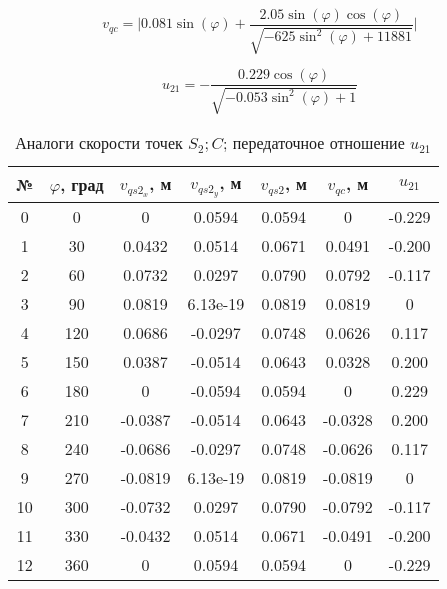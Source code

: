 \begin{equation}
	v_{qc} = \Big | 0.081 \sin{\left (\varphi \right )} + \frac{2.05 \sin{\left (\varphi \right )} \cos{\left (\varphi \right )}}{\sqrt{- 625 \sin^{2}{\left (\varphi \right )} + 11881}} \Big |
\end{equation}

\begin{equation}
	u_{21} = - \frac{0.229 \cos{\left (\varphi \right )}}{\sqrt{- 0.053 \sin^{2}{\left (\varphi \right )} + 1}}
\end{equation}

\begin{table}
\caption{Аналоги скорости точек $S_2; C$; передаточное отношение $u_{21}$}
\begin{tabular}{|c|c|c|c|c|c|c|}
	\hline 
	№& $\varphi$, град & $v_{qs2_x}$, м & $v_{qs2_y}$, м & $v_{qs2}$, м & $v_{qc}$, м & $u_{21}$ \\ 
	\hline 
	0  &    0 &        0 &    0.0594 &  0.0594 &        0 &  -0.229 \\
	\hline 
	1  &   30 &   0.0432 &    0.0514 &  0.0671 &   0.0491 &  -0.200 \\
	\hline 
	2  &   60 &   0.0732 &    0.0297 &  0.0790 &   0.0792 &  -0.117 \\
	\hline 
	3  &   90 &   0.0819 &  6.13e-19 &  0.0819 &   0.0819 &       0 \\
	\hline 
	4  &  120 &   0.0686 &   -0.0297 &  0.0748 &   0.0626 &   0.117 \\
	\hline 
	5  &  150 &   0.0387 &   -0.0514 &  0.0643 &   0.0328 &   0.200 \\
	\hline 
	6  &  180 &        0 &   -0.0594 &  0.0594 &        0 &   0.229 \\
	\hline 
	7  &  210 &  -0.0387 &   -0.0514 &  0.0643 &  -0.0328 &   0.200 \\
	\hline 
	8  &  240 &  -0.0686 &   -0.0297 &  0.0748 &  -0.0626 &   0.117 \\
	\hline 
	9  &  270 &  -0.0819 &  6.13e-19 &  0.0819 &  -0.0819 &       0 \\
	\hline 
	10 &  300 &  -0.0732 &    0.0297 &  0.0790 &  -0.0792 &  -0.117 \\
	\hline 
	11 &  330 &  -0.0432 &    0.0514 &  0.0671 &  -0.0491 &  -0.200 \\
	\hline 
	12 &  360 &        0 &    0.0594 &  0.0594 &        0 &  -0.229 \\
	\hline
\end{tabular} 
\end{table}

